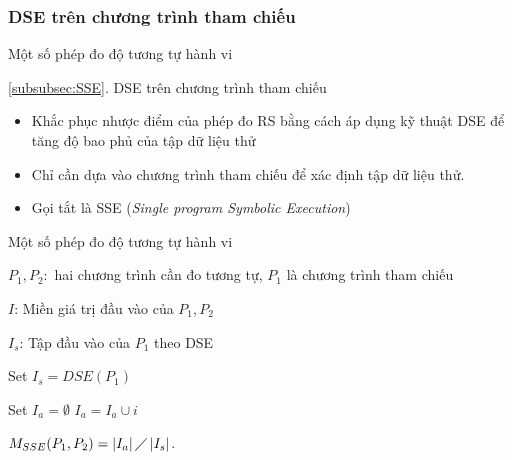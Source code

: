 \subsubsection*{DSE trên chương trình tham chiếu}
\label{subsubsec:SSE}
\begin{frame}{Một số phép đo độ tương tự hành vi}
\begin{block}{\ref{subsubsec:SSE}. DSE trên chương trình tham chiếu}
\begin{itemize}
	\item Khắc phục nhược điểm của phép đo RS bằng cách áp dụng kỹ thuật
	DSE để tăng độ bao phủ của tập dữ liệu thử
	\item Chỉ cần dựa vào chương trình tham chiếu để xác
	định tập dữ liệu thử.
	\item Gọi tắt là SSE (\emph{Single program Symbolic Execution})
\end{itemize}
\end{block}
\end{frame}

\begin{frame}{Một số phép đo độ tương tự hành vi}
\begin{algorithm}[H]
\caption{Thuật toán phép đo SSE}
\begin{algorithmic}[1]
  \item $P_{1}, P_{2}:$ hai chương trình cần đo tương tự, $P_1$ là chương trình tham chiếu
  \item $I$: Miền giá trị đầu vào của $P_{1}, P_{2}$
  \item $I_{s}$: Tập đầu vào của $P_{1}$ theo DSE
  \item Set $I_{s} = DSE(P_{1})$  
  \item Set $I_{a} = \emptyset$
	\STATE $I_{a} = I_{a} \cup i$
    \ENDIF
    \ENDFOR
  \item
    $M_{SSE}(P_{1}, P_{2}) = \left|I_{a}\right| \diagup
    \left|I_{s}\right| $.
  \end{algorithmic}
\end{algorithm}
\end{frame}

